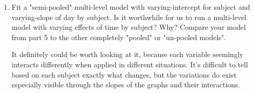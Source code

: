 \documentclass[12pt,letterpaper]{article}
\begin{document}
\begin{enumerate}
	\item Fit a "semi-pooled" multi-level model with varying-intercept for subject and varying-slope of day by subject. Is it worthwhile for us to run a multi-level model with varying effects of time by subject? Why? Compare your model from part 5 to the other completely "pooled" or "un-pooled models".
	
\vspace{.5cm}
  
\vspace{.5cm}

It definitely could be worth looking at it, because each variable seemingly interacts differently when applied in different situations. It's difficult to tell based on each subject exactly what changes, but the variations do exist especially visible through the slopes of the graphs and their interactions. 
\end{enumerate}
\end{document}
